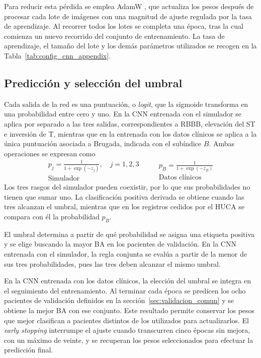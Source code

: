 Para reducir esta pérdida se emplea AdamW \cite{loshchilov2019}, que actualiza los pesos después de procesar cada lote de imágenes con una magnitud de ajuste regulada por la tasa de aprendizaje. Al recorrer todos los lotes se completa una época, tras la cual comienza un nuevo recorrido del conjunto de entrenamiento. La tasa de aprendizaje, el tamaño del lote y los demás parámetros utilizados se recogen en la Tabla~\ref{tab:config_cnn_appendix}.

\subsection{Predicción y selección del umbral}
\label{sec:umbral_cnn}

Cada salida de la red es una puntuación, o \textit{logit}, que la sigmoide transforma en una probabilidad entre cero y uno. En la CNN entrenada con el simulador se aplica por separado a las tres salidas, correspondientes a RBBB, elevación del ST e inversión de T, mientras que en la entrenada con los datos clínicos se aplica a la única puntuación asociada a Brugada, indicada con el subíndice \(B\). Ambas operaciones se expresan como
\begin{equation}
  \begin{gathered}
    p_j = \frac{1}{1+\exp(-z_j)},\quad j=1,2,3\\
    \text{Simulador}
  \end{gathered}
  \qquad
  \begin{gathered}
    p_B = \frac{1}{1+\exp(-z_B)}\\
    \text{Datos clínicos}
  \end{gathered}
  \label{eq:probabilidades_cnn}
\end{equation}
Los tres rasgos del simulador pueden coexistir, por lo que sus probabilidades no tienen que sumar uno. La clasificación positiva derivada se obtiene cuando las tres alcanzan el umbral, mientras que en los registros cedidos por el HUCA se compara con él la probabilidad \(p_B\).

El umbral determina a partir de qué probabilidad se asigna una etiqueta positiva y se elige buscando la mayor BA en los pacientes de validación. En la CNN entrenada con el simulador, la regla conjunta se evalúa a partir de la menor de sus tres probabilidades, pues las tres deben alcanzar el mismo umbral.

\begingroup
{}
En la CNN entrenada con los datos clínicos, la elección del umbral se integra en el seguimiento del entrenamiento. Al terminar cada época se predicen los ocho pacientes de validación definidos en la sección~\ref{sec:validacion_comun} y se obtiene la mejor BA con ese conjunto. Este resultado permite conservar los pesos que mejor clasifican a pacientes distintos de los utilizados para actualizarlos. El \textit{early stopping} interrumpe el ajuste cuando transcurren cinco épocas sin mejora, con un máximo de veinte, y se recuperan los pesos seleccionados para efectuar la predicción final.
\par
\endgroup


